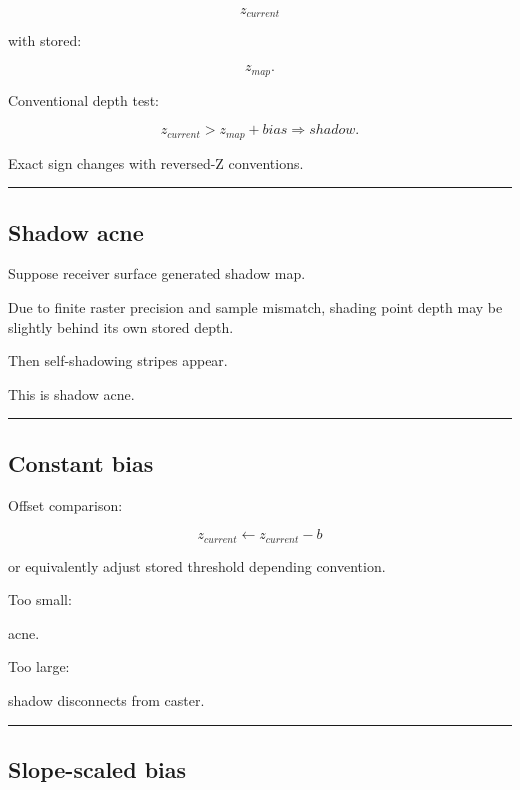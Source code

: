 \[
z_{current}
\]

with stored:

\[
z_{map}.
\]

Conventional depth test:

\[
\boxed{
z_{current}
>
z_{map}+bias
\Rightarrow
shadow.
}
\]

Exact sign changes with reversed-Z conventions.

\begin{center}\rule{0.5\linewidth}{0.5pt}\end{center}

\subsection{Shadow acne}\label{04-visual-computing-ii-ch040-shadow-acne}

Suppose receiver surface generated shadow map.

Due to finite raster precision and sample mismatch, shading point depth may be slightly behind its own stored depth.

Then self-shadowing stripes appear.

This is shadow acne.

\begin{center}\rule{0.5\linewidth}{0.5pt}\end{center}

\subsection{Constant bias}\label{04-visual-computing-ii-ch040-constant-bias}

Offset comparison:

\[
z_{current}
\leftarrow
z_{current}-b
\]

or equivalently adjust stored threshold depending convention.

Too small:

acne.

Too large:

shadow disconnects from caster.

\begin{center}\rule{0.5\linewidth}{0.5pt}\end{center}

\subsection{Slope-scaled bias}\label{04-visual-computing-ii-ch040-slope-scaled-bias}

